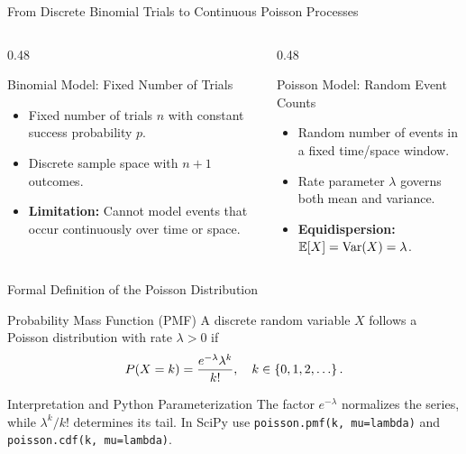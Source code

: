 \documentclass[aspectratio=169,xcolor={dvipsnames,table}]{beamer}
\begin{document}
\begin{frame}{From Discrete Binomial Trials to Continuous Poisson Processes}
	\vspace{-0.15cm}
	\begin{columns}[T]
		\begin{column}{0.48\textwidth}
			\begin{block}{Binomial Model: Fixed Number of Trials}
				\footnotesize
				\begin{itemize}\itemsep=0.05cm
					\item Fixed number of trials $n$ with constant success probability $p$.
					\item Discrete sample space with $n+1$ outcomes.
					\item \textbf{Limitation:} Cannot model events that occur continuously over time or space.
				\end{itemize}
			\end{block}
		\end{column}
		\begin{column}{0.48\textwidth}
			\begin{alertblock}{Poisson Model: Random Event Counts}
				\footnotesize
				\begin{itemize}\itemsep=0.05cm
					\item Random number of events in a fixed time/space window.
					\item Rate parameter $\lambda$ governs both mean and variance.
					\item \textbf{Equidispersion:} $\mathbb{E}[X] = \operatorname{Var}(X) = \lambda$.
				\end{itemize}
			\end{alertblock}
		\end{column}
	\end{columns}
\end{frame}

\begin{frame}{Formal Definition of the Poisson Distribution}
	\vspace{-0.15cm}
	\begin{block}{Probability Mass Function (PMF)}
		\scriptsize
		A discrete random variable $X$ follows a Poisson distribution with rate $\lambda > 0$ if
		$$P(X=k)=\dfrac{e^{-\lambda}\lambda^k}{k!},\quad k\in\set{0,1,2,\dots}.$$
	\end{block}
	\vspace{-0.1cm}
	\begin{alertblock}{Interpretation and Python Parameterization}
		\scriptsize
		The factor $e^{-\lambda}$ normalizes the series, while $\lambda^k/k!$ determines its tail. In SciPy use \texttt{poisson.pmf(k, mu=lambda)} and \texttt{poisson.cdf(k, mu=lambda)}.
	\end{alertblock}
\end{frame}
\end{document}

